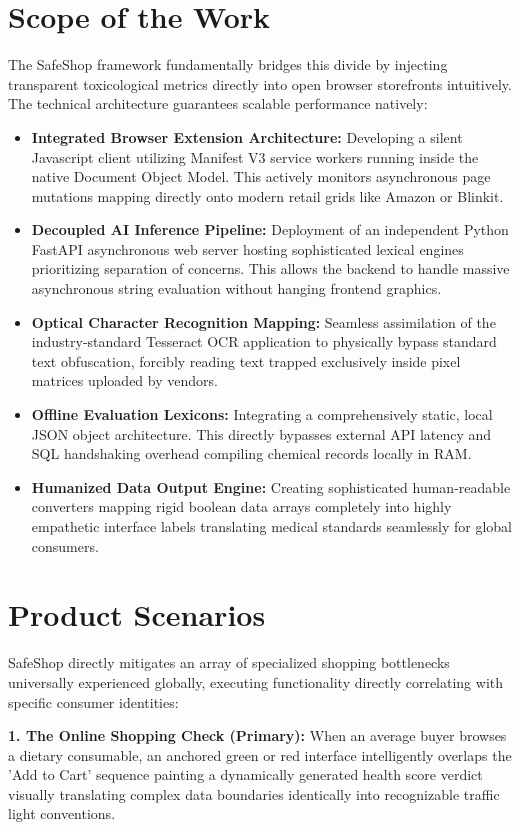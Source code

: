 \documentclass[12pt,a4paper]{report}
\begin{document}
\section{Scope of the Work}
The SafeShop framework fundamentally bridges this divide by injecting transparent toxicological metrics directly into open browser storefronts intuitively. The technical architecture guarantees scalable performance natively:
\begin{itemize}
    \item \textbf{Integrated Browser Extension Architecture:} Developing a silent Javascript client utilizing Manifest V3 service workers running inside the native Document Object Model. This actively monitors asynchronous page mutations mapping directly onto modern retail grids like Amazon or Blinkit.
    \item \textbf{Decoupled AI Inference Pipeline:} Deployment of an independent Python FastAPI asynchronous web server hosting sophisticated lexical engines prioritizing separation of concerns. This allows the backend to handle massive asynchronous string evaluation without hanging frontend graphics.
    \item \textbf{Optical Character Recognition Mapping:} Seamless assimilation of the industry-standard Tesseract OCR application to physically bypass standard text obfuscation, forcibly reading text trapped exclusively inside pixel matrices uploaded by vendors.
    \item \textbf{Offline Evaluation Lexicons:} Integrating a comprehensively static, local JSON object architecture. This directly bypasses external API latency and SQL handshaking overhead compiling chemical records locally in RAM.
    \item \textbf{Humanized Data Output Engine:} Creating sophisticated human-readable converters mapping rigid boolean data arrays completely into highly empathetic interface labels translating medical standards seamlessly for global consumers.
\end{itemize}

\section{Product Scenarios}
SafeShop directly mitigates an array of specialized shopping bottlenecks universally experienced globally, executing functionality directly correlating with specific consumer identities:

\textbf{1. The Online Shopping Check (Primary):} When an average buyer browses a dietary consumable, an anchored green or red interface intelligently overlaps the 'Add to Cart' sequence painting a dynamically generated health score verdict visually translating complex data boundaries identically into recognizable traffic light conventions.
\end{document}

